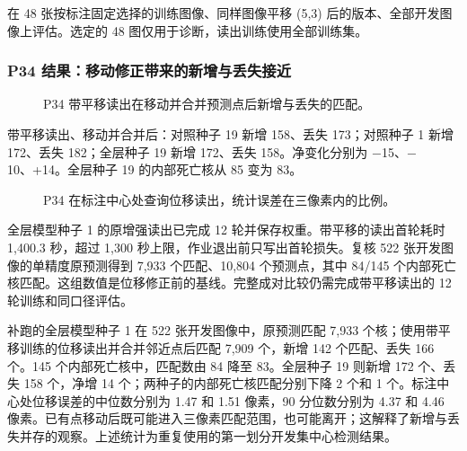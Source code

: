 \documentclass[
  12pt,
  fontset=fandol]{ctexart}
\begin{document}
\begin{center}\end{center}
在 48 张按标注固定选择的训练图像、同样图像平移 (5,3) 后的版本、全部开发图像上评估。选定的 48 图仅用于诊断，读出训练使用全部训练集。

\subsubsection{P34 结果：移动修正带来的新增与丢失接近}\label{chapter14}
\begin{figure}[H]\centering\caption{P34 带平移读出在移动并合并预测点后新增与丢失的匹配。}\end{figure}
带平移读出、移动并合并后：对照种子 19 新增 158、丢失 173；对照种子 1 新增 172、丢失 182；全层种子 19 新增 172、丢失 158。净变化分别为 \ensuremath{-}15、\ensuremath{-}10、+14。全层种子 19 的内部死亡核从 85 变为 83。

\begin{figure}[H]\centering\caption{P34 在标注中心处查询位移读出，统计误差在三像素内的比例。}\end{figure}
全层模型种子 1 的原增强读出已完成 12 轮并保存权重。带平移的读出首轮耗时 1,400.3 秒，超过 1,300 秒上限，作业退出前只写出首轮损失。复核 522 张开发图像的单精度原预测得到 7,933 个匹配、10,804 个预测点，其中 84/145 个内部死亡核匹配。这组数值是位移修正前的基线。完整成对比较仍需完成带平移读出的 12 轮训练和同口径评估。

补跑的全层模型种子 1 在 522 张开发图像中，原预测匹配 7,933 个核；使用带平移训练的位移读出并合并邻近点后匹配 7,909 个，新增 142 个匹配、丢失 166 个。145 个内部死亡核中，匹配数由 84 降至 83。全层种子 19 则新增 172 个、丢失 158 个，净增 14 个；两种子的内部死亡核匹配分别下降 2 个和 1 个。标注中心处位移误差的中位数分别为 1.47 和 1.51 像素，90 分位数分别为 4.37 和 4.46 像素。已有点移动后既可能进入三像素匹配范围，也可能离开；这解释了新增与丢失并存的观察。上述统计为重复使用的第一划分开发集中心检测结果。
\end{document}
